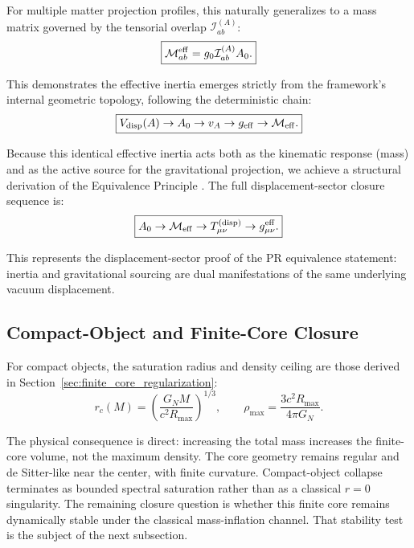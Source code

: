 \documentclass[11pt]{article}
\begin{document}
For multiple matter projection profiles, this naturally generalizes to a mass matrix governed by the tensorial overlap $\mathcal I_{ab}^{(A)}$:
\begin{equation}
\boxed{
\mathcal M_{ab}^{\rm eff}
=
g_0\mathcal I_{ab}^{(A)}A_0.
}
\end{equation}

This demonstrates the effective inertia emerges strictly from the framework's internal geometric topology, following the deterministic chain:
\begin{equation}
\boxed{
V_{\rm disp}(A)
\rightarrow
A_0
\rightarrow
v_A
\rightarrow
g_{\rm eff}
\rightarrow
\mathcal M_{\rm eff}.
}
\end{equation}

Because this identical effective inertia acts both as the kinematic response (mass) and as the active source for the gravitational projection, we achieve a structural derivation of the Equivalence Principle \cite{Will2014}. The full displacement-sector closure sequence is:
\begin{equation}
\boxed{
A_0
\rightarrow
\mathcal M_{\rm eff}
\rightarrow
T_{\mu\nu}^{(\rm disp)}
\rightarrow
g_{\mu\nu}^{\rm eff}.
}
\end{equation}

This represents the displacement-sector proof of the PR equivalence statement: inertia and gravitational sourcing are dual manifestations of the same underlying vacuum displacement.

\subsection{Compact-Object and Finite-Core Closure}
\label{sec:compact_object_consequence}

For compact objects, the saturation radius and density ceiling are those derived 
in Section~\ref{sec:finite_core_regularization}:
\begin{equation}
\boxed{
r_c(M)
=
\left(
\frac{G_NM}{c^2R_{\max}}
\right)^{1/3},
\qquad
\rho_{\max}
=
\frac{3c^2R_{\max}}{4\pi G_N}.
}
\end{equation}

The physical consequence is direct: increasing the total mass increases the 
finite-core volume, not the maximum density. The core geometry remains regular 
and de Sitter-like near the center, with finite curvature. Compact-object 
collapse terminates as bounded spectral saturation rather than as a classical 
\(r=0\) singularity. The remaining closure question is whether this finite core remains dynamically
stable under the classical mass-inflation channel. That stability test is the
subject of the next subsection.
\end{document}

